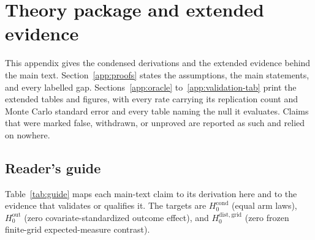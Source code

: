 \section{Theory package and extended evidence}
\label{app:theory}

This appendix gives the condensed derivations and the extended evidence behind the main text. Section~\ref{app:proofs} states the assumptions, the main statements, and every labelled gap. Sections~\ref{app:oracle} to~\ref{app:validation-tab} print the extended tables and figures, with every rate carrying its replication count and Monte Carlo standard error and every table naming the null it evaluates. Claims that were marked false, withdrawn, or unproved are reported as such and relied on nowhere.

\subsection{Reader's guide}
\label{app:guide}

Table~\ref{tab:guide} maps each main-text claim to its derivation here and to the evidence that validates or qualifies it. The targets are $H_0^{\mathrm{cond}}$ (equal arm laws), $H_0^{\mathrm{out}}$ (zero covariate-standardized outcome effect), and $H_0^{\mathrm{dist,grid}}$ (zero frozen finite-grid expected-measure contrast).

